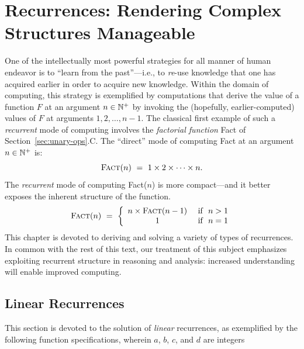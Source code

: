 
\chapter{Recurrences:
Rendering Complex Structures Manageable}
\label{ch:Recurrences}

One of the intellectually most powerful strategies for all manner of
human endeavor is to ``learn from the past''---i.e., to {\em re}-use
knowledge that one has acquired earlier in order to acquire new
knowledge.  Within the domain of computing, this strategy is
exemplified by computations that derive the value of a function $F$ at
an argument $n \in \mathbb{N}^+$ by invoking the (hopefully, earlier-computed)
values of $F$ at arguments $1, 2, \ldots, n-1$.  The classical first
example of such a {\it recurrent} mode of computing involves the {\it
  factorial function} {\sc Fact} of Section~\ref{sec:unary-ops}.C.
The ``direct'' mode of computing {\sc Fact} at an argument $n \in
\mathbb{N}^+$ is:
\[ \mbox{\sc Fact}(n) \ = \ 1 \times 2 \times \cdots \times n. \]
The {\em recurrent} mode of computing {\sc Fact}($n$) is more
compact---and it better exposes the inherent structure of the
function.
\[ \mbox{\sc Fact}(n) \ = \ \left\{
\begin{array}{cl}
 n \times \mbox{\sc Fact}(n-1) & \mbox{ if } \ n > 1 \\
 1 & \mbox{ if } \ n = 1 \\
\end{array}
\right.
\]
This chapter is devoted to deriving and solving a variety of types of
recurrences.  In common with the rest of this text, our treatment of
this subject emphasizes exploiting recurrent structure in reasoning
and analysis: increased understanding will enable improved computing.


\section{Linear Recurrences}
\label{sec:linear-recurrences}

This section is devoted to the solution of {\em linear} recurrences,
as exemplified by the following function specifications, wherein $a$,
$b$, $c$, and $d$ are integers


